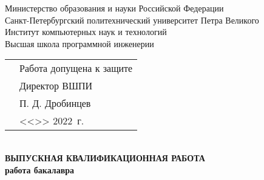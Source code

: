 \begin{titlepage}

  \begin{center} %




    Министерство образования и науки Российской Федерации\\
    Санкт-Петербургский политехнический университет Петра Великого\\
    Институт компьютерных наук и технологий\\
    Высшая школа программной инженерии\\[0.9cm]


    \begin{minipage}{\linewidth}
      \begin{tabularx}{\linewidth}{X@{}l@{}}
         & Работа допущена к защите                                                               \\
         & Директор ВШПИ                                                                          \\
         & \underline{\hspace*{0.1\textheight}} П. Д. Дробинцев                                   \\
         & <<\underline{\hspace*{0.05\textheight}}>> \underline{\hspace*{0.1\textheight}} 2022~г. \\
      \end{tabularx}
    \end{minipage}\\[1.5cm]

    {\Large \bfseries ВЫПУСКНАЯ КВАЛИФИКАЦИОННАЯ РАБОТА}\\
    {\Large \bfseries работа бакалавра}\\[1.5cm]


    {\Large \bfseries \MakeUppercase{\Theme}}\\[0.4cm] %


\end{center}
\end{titlepage}
